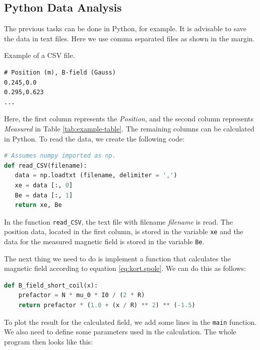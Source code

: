 \documentclass[../Elmag-labhefte-2020.tex]{subfiles}
\begin{document}
\FloatBarrier %
\subsection{Python Data Analysis}
The previous tasks can be done in Python, for example. It is advisable to save the data in text files. Here we use comma separated files as shown in the margin.
\begin{marginlisting}
  Example of a CSV file.
\begin{verbatim}
# Position (m), B-field (Gauss)
0.245,0.0
0.295,0.623
...
\end{verbatim}
\end{marginlisting}
Here, the first column represents the \emph{Position}, and the second column represents \emph{Measured} in Table \ref{tab:example-table}. The remaining columns can be calculated in Python. To read the data, we create the following code:

\begin{lstlisting}[language=python]
# Assumes numpy imported as np.
def read_CSV(filename):
   data = np.loadtxt (filename, delimiter = ',')
   xe = data [:, 0]
   Be = data [:, 1]
   return xe, Be
\end{lstlisting}
In the function \texttt{read\_CSV}, the text file with filename \emph{filename} is read. The position data, located in the first column, is stored in the variable \texttt{xe} and the data for the measured magnetic field is stored in the variable \texttt{Be}.

The next thing we need to do is implement a function that calculates the magnetic field according to equation \eqref{eq:kort.spole}. We can do this as follows:

\begin{lstlisting}[language=python]
def B_field_short_coil(x):
    prefactor = N * mu_0 * I0 / (2 * R)
    return prefactor * (1.0 + (x / R) ** 2) ** (-1.5)
\end{lstlisting}
To plot the result for the calculated field, we add some lines in the \texttt{main} function. We also need to define some parameters used in the calculation. The whole program then looks like this:
\end{document}
